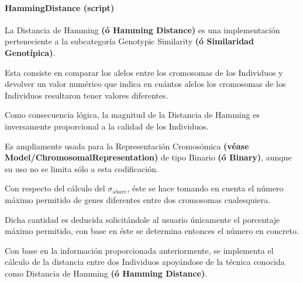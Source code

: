 \documentclass[letterpaper,10pt,english]{sphinxmanual}
\begin{document}
\paragraph{HammingDistance (script)}
\label{Model/SharingFunction/GenotypicSimilarity/HammingDistance:hammingdistance-script}\label{Model/SharingFunction/GenotypicSimilarity/HammingDistance::doc}
\begin{DUlineblock}{0em}
\item[] La Distancia de Hamming \textbf{(ó Hamming Distance)} es una implementación
perteneciente a la subcategoría Genotypic Similarity \textbf{(ó Similaridad Genotípica)}.
\item[] Esta consiste en comparar los alelos entre los cromosomas de los Individuos y devolver un valor numérico
que indica en cuántos alelos los cromosomas de los Individuos resultaron tener valores diferentes.
\item[] Como consecuencia lógica, la magnitud de la Distancia de Hamming es inversamente proporcional a la calidad
de los Individuos.
\item[] 
\item[] Es ampliamente usada para la Representación Cromosómica \textbf{(véase Model/ChromosomalRepresentation)}
de tipo Binario \textbf{(ó Binary)}, aunque su uso no se limita sólo a esta codificación.
\item[] 
\item[] Con respecto del cálculo del \(\sigma_{share}\), éste se hace tomando en cuenta el número máximo
permitido de genes diferentes entre dos cromosomas cualesquiera.
\item[] Dicha cantidad es deducida solicitándole al usuario únicamente el porcentaje máximo permitido, con base
en éste se determina entonces el número en concreto.
\end{DUlineblock}
\label{Model/SharingFunction/GenotypicSimilarity/HammingDistance:module-Model.SharingFunction.GenotypicSimilarity.HammingDistance}

\begin{fulllineitems}
\label{Model/SharingFunction/GenotypicSimilarity/HammingDistance:Model.SharingFunction.GenotypicSimilarity.HammingDistance.calculate_distance}
Con base en la información proporcionada anteriormente, se implementa
el cálculo de la distancia entre dos Individuos apoyándose de la técnica
conocida como Distancia de Hamming \textbf{(ó Hamming Distance)}.

\end{fulllineitems}
\end{document}
